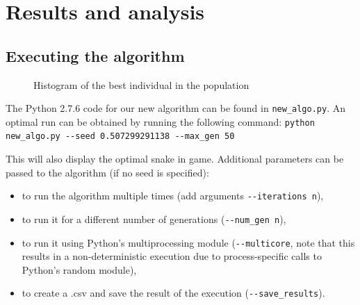 \documentclass[british,10pt,a4paper]{article}
\begin{document}
\section{Results and analysis}
\subsection{Executing the algorithm}
\label{subsec:results_score}
\begin{figure}
	\centering
	\vspace{-30pt}
	\vspace{-10pt}
	\caption{Histogram of the best individual in the population}
	\label{fig:approach1_vs_approach4}
	\vspace{-30pt}
\end{figure}
The Python 2.7.6 code for our new algorithm can be found in \lstinline{new_algo.py}. An optimal run can be obtained by running the following command: 
\lstinline{python new_algo.py --seed 0.507299291138 --max_gen 50}

This will also display the optimal snake in game. Additional parameters can be passed to the algorithm (if no seed is specified):
\begin{itemize}
	\item to run the algorithm multiple times (add arguments \lstinline{--iterations n}), 
	\item to run it for a different number of generations (\lstinline{--num_gen n}), 
	\item to run it using Python's multiprocessing module (\lstinline{--multicore}, note that this results in a non-deterministic execution due to process-specific calls to Python's random module), 
	\item to create a .csv and save the result of the execution (\lstinline{--save_results}).
\end{itemize}
\end{document}
